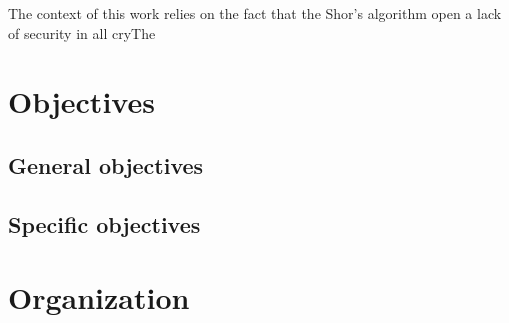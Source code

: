 The context of this work relies on the fact that the Shor's algorithm open a lack of security in all cryThe \cite{mceliece1978public}
\section{Objectives}
\subsection{General objectives}
\subsection{Specific objectives}
\section{Organization}

